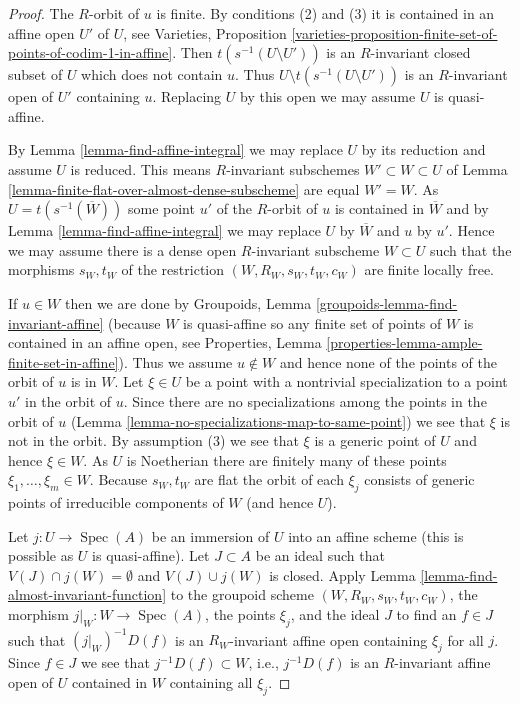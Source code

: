 \documentclass{stacks-project}
\theoremstyle{plain}
\theoremstyle{definition}
\theoremstyle{remark}
\numberwithin{equation}{subsection}
\def\Spec{\mathop{\mathrm{Spec}}}
\begin{document}
\begin{proof}
The $R$-orbit of $u$ is finite. By conditions (2) and (3) it is contained
in an affine open $U'$ of $U$, see
Varieties, Proposition
\ref{varieties-proposition-finite-set-of-points-of-codim-1-in-affine}.
Then $t(s^{-1}(U \setminus U'))$ is an $R$-invariant
closed subset of $U$ which does not contain $u$. Thus
$U \setminus t(s^{-1}(U \setminus U'))$ is an $R$-invariant open
of $U'$ containing $u$.
Replacing $U$ by this open we may assume $U$ is quasi-affine.

\medskip\noindent
By Lemma \ref{lemma-find-affine-integral} we may replace $U$ by its reduction
and assume $U$ is reduced. This means $R$-invariant subschemes
$W' \subset W \subset U$ of
Lemma \ref{lemma-finite-flat-over-almost-dense-subscheme}
are equal $W' = W$. As $U = t(s^{-1}(\overline{W}))$ some point
$u'$ of the $R$-orbit of $u$ is contained in $\overline{W}$
and by Lemma \ref{lemma-find-affine-integral}
we may replace $U$ by $\overline{W}$ and $u$ by $u'$.
Hence we may assume there is
a dense open $R$-invariant subscheme $W \subset U$ such that
the morphisms $s_W, t_W$ of the restriction $(W, R_W, s_W, t_W, c_W)$ are
finite locally free.

\medskip\noindent
If $u \in W$ then we are done by
Groupoids, Lemma \ref{groupoids-lemma-find-invariant-affine}
(because $W$ is quasi-affine so any finite set of points
of $W$ is contained in an affine open, see
Properties, Lemma \ref{properties-lemma-ample-finite-set-in-affine}).
Thus we assume $u \not \in W$ and hence none of the points of the
orbit of $u$ is in $W$. Let $\xi \in U$
be a point with a nontrivial specialization to a point $u'$ in the orbit
of $u$. Since there are no specializations among the points in the
orbit of $u$ (Lemma \ref{lemma-no-specializations-map-to-same-point})
we see that $\xi$ is not in the orbit.
By assumption (3) we see that $\xi$ is a generic point of $U$
and hence $\xi \in W$.
As $U$ is Noetherian there are finitely many of these
points $\xi_1, \ldots, \xi_m \in W$. Because $s_W, t_W$ are flat the orbit
of each $\xi_j$ consists of generic points of irreducible components
of $W$ (and hence $U$).

\medskip\noindent
Let $j : U \to \Spec(A)$ be an immersion of $U$ into an affine scheme
(this is possible as $U$ is quasi-affine). Let $J \subset A$
be an ideal such that $V(J) \cap j(W) = \emptyset$ and $V(J) \cup j(W)$
is closed. Apply Lemma \ref{lemma-find-almost-invariant-function}
to the groupoid scheme $(W, R_W, s_W, t_W, c_W)$, the morphism
$j|_W : W \to \Spec(A)$, the points $\xi_j$, and the ideal $J$
to find an $f \in J$ such that $(j|_W)^{-1}D(f)$ is an $R_W$-invariant
affine open containing $\xi_j$ for all $j$. Since $f \in J$
we see that $j^{-1}D(f) \subset W$, i.e., $j^{-1}D(f)$ is
an $R$-invariant affine open of $U$ contained in $W$
containing all $\xi_j$.


\end{proof}
\end{document}
